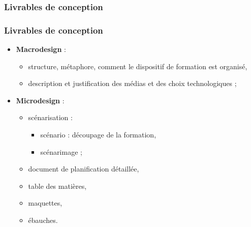 						\subsubsection{Livrables de conception} 
							\begin{frame}[allowframebreaks]
							\frametitle{Livrables de conception}
                        			
							\begin{itemize}
							\item \textbf{Macrodesign} : 
								\begin{itemize}
								\item structure, métaphore, comment le dispositif de formation est organisé,
								\item description et justification des médias et des choix technologiques ;
								\end{itemize}
							\item \textbf{Microdesign} :
								\begin{itemize}
								\item scénarisation : 
									\begin{itemize}
									\item scénario : découpage de la formation,
									\item scénarimage ;
									\end{itemize}
								\item document de planification détaillée,
								\item table des matières,
								\item maquettes,
								\item ébauches.
								\end{itemize}								
							\end{itemize}						
					\end{frame}
					
					
